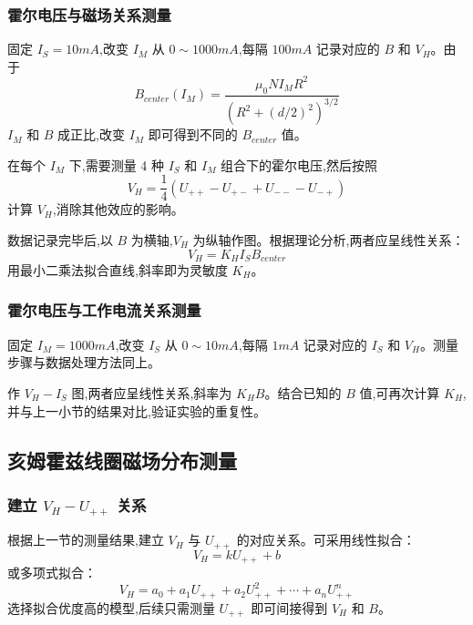 \documentclass[UTF8]{ctexart}
\begin{document}
    \subsubsection{霍尔电压与磁场关系测量}
    固定 $I_S=10mA$,改变 $I_M$ 从 $0\sim1000mA$,每隔 $100mA$ 记录对应的 $B$ 和 $V_H$。由于
    \begin{equation}
        B_{center}(I_M) = \frac{\mu_0 N I_M R^2}{(R^2+(d/2)^2)^{3/2}} 
        \end{equation}
    $I_M$ 和 $B$ 成正比,改变 $I_M$ 即可得到不同的 $B_{center}$ 值。
    
    在每个 $I_M$ 下,需要测量 4 种 $I_S$ 和 $I_M$ 组合下的霍尔电压,然后按照
    \begin{equation}
    V_H = \frac{1}{4}(U_{++} - U_{+-} + U_{--} - U_{-+})
    \end{equation} 
    计算 $V_H$,消除其他效应的影响。
    
    数据记录完毕后,以 $B$ 为横轴,$V_H$ 为纵轴作图。根据理论分析,两者应呈线性关系：
    \begin{equation}
    V_H = K_H I_S B_{center}
    \end{equation}
    用最小二乘法拟合直线,斜率即为灵敏度 $K_H$。
    

    
    \subsubsection{霍尔电压与工作电流关系测量}
    固定 $I_M=1000mA$,改变 $I_S$ 从 $0\sim10mA$,每隔 $1mA$ 记录对应的 $I_S$ 和 $V_H$。测量步骤与数据处理方法同上。
    
    作 $V_H-I_S$ 图,两者应呈线性关系,斜率为 $K_H B$。结合已知的 $B$ 值,可再次计算 $K_H$,并与上一小节的结果对比,验证实验的重复性。
    

    
    \subsection{亥姆霍兹线圈磁场分布测量}
    \subsubsection{建立 $V_H-U_{++}$ 关系}
    根据上一节的测量结果,建立 $V_H$ 与 $U_{++}$ 的对应关系。可采用线性拟合：
    \begin{equation}
    V_H = k U_{++} + b    
    \end{equation}
    或多项式拟合：
    \begin{equation}
    V_H = a_0 + a_1 U_{++} + a_2 U_{++}^2 + \cdots + a_n U_{++}^n    
    \end{equation}
    选择拟合优度高的模型,后续只需测量 $U_{++}$ 即可间接得到 $V_H$ 和 $B$。
    
\end{document}
